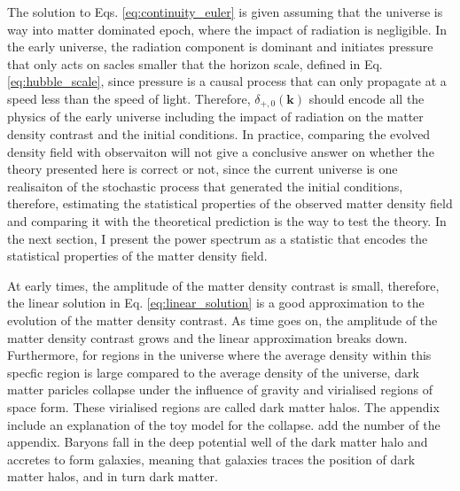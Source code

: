 The solution to Eqs. \ref{eq:continuity_euler} is given assuming that the universe is way into matter dominated epoch, where the impact of radiation is negligible. In the early universe, the radiation component is dominant and initiates pressure that only acts on sacles smaller that the horizon scale, defined in Eq. \ref{eq:hubble_scale}, since pressure is a causal process that can only propagate at a speed less than the speed of light. Therefore, $\delta_{+,0}(\mathbf{k})$ should encode all the physics of the early universe including the impact of radiation on the matter density contrast and the initial conditions. In practice, comparing the evolved density field with observaiton will not give a conclusive answer on whether the theory presented here is correct or not, since the current universe is one realisaiton of the stochastic process that generated the initial conditions, therefore, estimating the statistical properties of the observed matter density field and comparing it with the theoretical prediction is the way to test the theory. In the next section, I present the power spectrum as a statistic that encodes the statistical properties of the matter density field.

At early times, the amplitude of the matter density contrast is small, therefore, the linear solution in Eq. \ref{eq:linear_solution} is a good approximation to the evolution of the matter density contrast. As time goes on, the amplitude of the matter density contrast grows and the linear approximation breaks down. Furthermore, for regions in the universe where the average density within this specfic region is large compared to the average density of the universe, dark matter paricles collapse under the influence of gravity and virialised regions of space form. These virialised regions are called dark matter halos.  The appendix include an explanation of the toy model for the collapse. {\color{red} add the number of the appendix}. Baryons fall in the deep potential well of the dark matter halo and accretes to form galaxies, meaning that galaxies traces the position of dark matter halos, and in turn dark matter.


